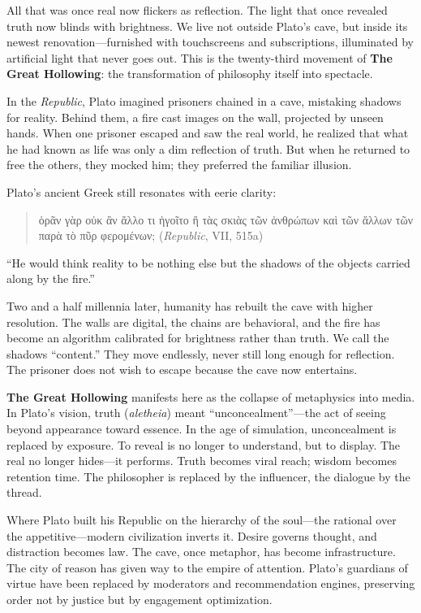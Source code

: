 \documentclass[11pt,twoside]{book}
\begin{document}
All that was once real now flickers as reflection.  
The light that once revealed truth now blinds with brightness.  We live not outside Plato’s cave, but inside its newest renovation—furnished with touchscreens and subscriptions, illuminated by artificial light that never goes out.  This is the twenty-third movement of \textbf{The Great Hollowing}: the transformation of philosophy itself into spectacle.

In the \emph{Republic}, Plato imagined prisoners chained in a cave, mistaking shadows for reality.  Behind them, a fire cast images on the wall, projected by unseen hands.  When one prisoner escaped and saw the real world, he realized that what he had known as life was only a dim reflection of truth.  But when he returned to free the others, they mocked him; they preferred the familiar illusion.

Plato’s ancient Greek still resonates with eerie clarity:
\begin{quote}
\foreignlanguage{greek}{ὁρᾶν γὰρ οὐκ ἂν ἄλλο τι ἡγοῖτο ἢ τὰς σκιὰς τῶν ἀνθρώπων καὶ τῶν ἄλλων τῶν παρὰ τὸ πῦρ φερομένων;}  
(\emph{Republic}, VII, 515a)
\end{quote}
“He would think reality to be nothing else but the shadows of the objects carried along by the fire.”  

Two and a half millennia later, humanity has rebuilt the cave with higher resolution.  The walls are digital, the chains are behavioral, and the fire has become an algorithm calibrated for brightness rather than truth.  We call the shadows “content.”  They move endlessly, never still long enough for reflection.  The prisoner does not wish to escape because the cave now entertains.

\textbf{The Great Hollowing} manifests here as the collapse of metaphysics into media.  In Plato’s vision, truth (\emph{aletheia}) meant “unconcealment”—the act of seeing beyond appearance toward essence.  In the age of simulation, unconcealment is replaced by exposure.  To reveal is no longer to understand, but to display.  The real no longer hides—it performs.  Truth becomes viral reach; wisdom becomes retention time.  The philosopher is replaced by the influencer, the dialogue by the thread.

Where Plato built his Republic on the hierarchy of the soul—the rational over the appetitive—modern civilization inverts it.  Desire governs thought, and distraction becomes law.  The cave, once metaphor, has become infrastructure.  The city of reason has given way to the empire of attention.  Plato’s guardians of virtue have been replaced by moderators and recommendation engines, preserving order not by justice but by engagement optimization.
\end{document}
